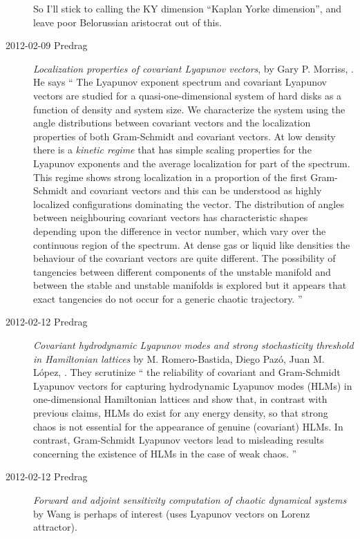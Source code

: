 \begin{description}
So I'll stick to calling the KY dimension  ``Kaplan Yorke dimension'', and
leave poor Belorussian aristocrat out of this.


\item[2012-02-09 Predrag]
{\em Localization properties of covariant {Lyapunov} vectors},
by Gary P. Morriss,
. He says
``
    The Lyapunov exponent spectrum and covariant Lyapunov vectors are studied for
a quasi-one-dimensional system of hard disks as a function of density and
system size. We characterize the system using the angle distributions between
covariant vectors and the localization properties of both Gram-Schmidt and
covariant vectors. At low density there is a {\it kinetic regime} that has
simple scaling properties for the Lyapunov exponents and the average
localization for part of the spectrum. This regime shows strong localization in
a proportion of the first Gram-Schmidt and covariant vectors and this can be
understood as highly localized configurations dominating the vector. The
distribution of angles between neighbouring covariant vectors has
characteristic shapes depending upon the difference in vector number, which
vary over the continuous region of the spectrum. At dense gas or liquid like
densities the behaviour of the covariant vectors are quite different. The
possibility of tangencies between different components of the unstable manifold
and between the stable and unstable manifolds is explored but it appears that
exact tangencies do not occur for a generic chaotic trajectory.
''

\item[2012-02-12 Predrag]
{\em Covariant hydrodynamic Lyapunov modes and strong stochasticity threshold
 in Hamiltonian lattices}
by M. Romero-Bastida, Diego Paz\'o, Juan M. L\'opez, . They scrutinize
``
the reliability of covariant and Gram-Schmidt Lyapunov vectors
for capturing hydrodynamic Lyapunov modes (HLMs) in one-dimensional Hamiltonian
lattices and show that, in contrast with previous claims, HLMs do exist for any
energy density, so that strong chaos is not essential for the appearance of
genuine (covariant) HLMs. In contrast, Gram-Schmidt Lyapunov vectors lead to
misleading results concerning the existence of HLMs in the case of weak chaos.
''

\item[2012-02-12 Predrag]
{\em Forward and adjoint sensitivity computation of chaotic dynamical
systems} by Wang is perhaps of interest (uses Lyapunov vectors
on Lorenz attractor).


\end{description}
